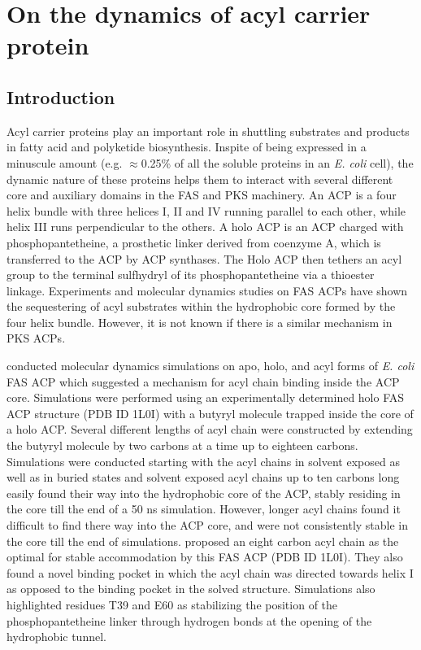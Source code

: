\chapter{On the dynamics of acyl carrier protein}
\label{cha:chap5}

\section{Introduction}
\label{sec:chap5-Intro}
Acyl carrier proteins play an important role in shuttling substrates and products in fatty acid and polyketide biosynthesis. Inspite of being expressed in a minuscule amount (e.g. $ \approx $0.25\% of all the soluble proteins in an \textit{E. coli} cell), the dynamic nature of these proteins helps them to interact with several different core and auxiliary domains in the FAS and PKS machinery. An ACP is a four helix bundle with three helices I, II and IV running parallel to each other, while helix III runs perpendicular to the others. A holo ACP is an ACP charged with phosphopantetheine, a prosthetic linker derived from coenzyme A, which is transferred to the ACP  by ACP synthases. The Holo ACP then tethers an acyl group to the terminal sulfhydryl of its phosphopantetheine via a thioester linkage. Experiments and molecular dynamics studies on FAS ACPs have shown the sequestering of acyl substrates within the hydrophobic core formed by the four helix bundle. However, it is not known if there is a similar mechanism in PKS ACPs. 

\textcite{Chan2008} conducted molecular dynamics simulations on apo, holo, and acyl forms of \textit{E. coli} FAS ACP which suggested a mechanism for acyl chain binding inside the ACP core. Simulations were performed using an experimentally determined holo FAS ACP structure (PDB ID 1L0I) with a butyryl molecule trapped inside the core of a holo ACP. Several different lengths of acyl chain were constructed by extending the butyryl molecule by two carbons at a time up to eighteen carbons. Simulations were conducted starting with the acyl chains in solvent exposed as well as in buried states and solvent exposed acyl chains up to ten carbons long easily found their way into the hydrophobic core of the ACP, stably residing in the core till the end of a 50 ns simulation. However, longer acyl chains found it difficult to find there way into the ACP core, and were not consistently stable in the core till the end of simulations. \textcite{Chan2008} proposed an eight carbon acyl chain as the optimal for stable accommodation by this FAS ACP (PDB ID 1L0I). They also found a novel binding pocket in which the acyl chain was directed towards helix I as opposed to the binding pocket in the solved structure. Simulations also highlighted residues T39 and E60 as stabilizing the position of the phosphopantetheine linker through hydrogen bonds at the opening of the hydrophobic tunnel. 


